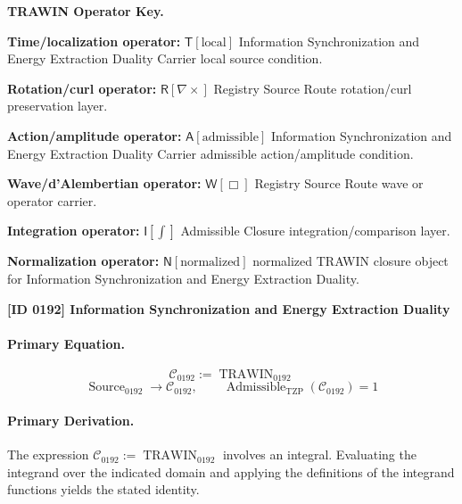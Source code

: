 \par\vspace{0.45\baselineskip}
\noindent\begin{minipage}[t]{\linewidth}
\begingroup
\small
\raggedright
\textbf{TRAWIN Operator Key.}\par
\noindent\textbf{Time/localization operator:} $\mathsf{T}\!\left[\mathrm{local}\right]$ Information Synchronization and Energy Extraction Duality Carrier local source condition.\par
\noindent\textbf{Rotation/curl operator:} $\mathsf{R}\!\left[\nabla\times\right]$ Registry Source Route rotation/curl preservation layer.\par
\noindent\textbf{Action/amplitude operator:} $\mathsf{A}\!\left[\mathrm{admissible}\right]$ Information Synchronization and Energy Extraction Duality Carrier admissible action/amplitude condition.\par
\noindent\textbf{Wave/d'Alembertian operator:} $\mathsf{W}\!\left[\Box\right]$ Registry Source Route wave or operator carrier.\par
\noindent\textbf{Integration operator:} $\mathsf{I}\!\left[\int\right]$ Admissible Closure integration/comparison layer.\par
\noindent\textbf{Normalization operator:} $\mathsf{N}\!\left[\mathrm{normalized}\right]$ normalized TRAWIN closure object for Information Synchronization and Energy Extraction Duality.\par
\endgroup
\end{minipage}

\clearpage
\noindent\textbf{[ID 0192] Information Synchronization and Energy Extraction Duality}\par
\vspace{0.35em}
\paragraph{Primary Equation.}
\[
\mathcal{C}_{0192} := \operatorname{TRAWIN}_{0192}
\]
\[
\operatorname{Source}_{0192}\longrightarrow \mathcal{C}_{0192},
\qquad
\operatorname{Admissible}_{\mathrm{TZP}}\!\left(\mathcal{C}_{0192}\right)=1
\]

\paragraph{Primary Derivation.}
The expression \( \mathcal{C}_{0192} := \operatorname{TRAWIN}_{0192} \) involves an integral. Evaluating the integrand over the indicated domain and applying the definitions of the integrand functions yields the stated identity.
